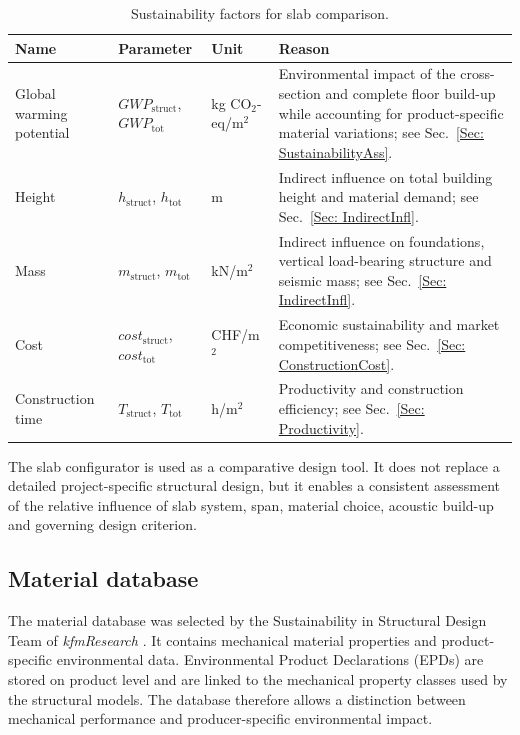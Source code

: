 \begin{table}[htbp]
    \centering
    \begingroup
    \small
    \setlength{\tabcolsep}{4pt}
    \renewcommand{\arraystretch}{1.15}
    \begin{tabularx}{\textwidth}{@{}l|l|l|X@{}}
    \hline
    \textbf{Name} & \textbf{Parameter} & \textbf{Unit} & \textbf{Reason} \\ \hline
    Global warming potential &
    $GWP_{\mathrm{struct}}$, $GWP_{\mathrm{tot}}$ &
    kg CO$_2$-eq/m$^2$ &
    Environmental impact of the cross-section and complete floor build-up while accounting for product-specific material variations; see Sec.~\ref{Sec: SustainabilityAss}. \\
    Height &
    $h_{\mathrm{struct}}$, $h_{\mathrm{tot}}$ &
    m &
    Indirect influence on total building height and material demand; see Sec.~\ref{Sec: IndirectInfl}. \\
    Mass &
    $m_{\mathrm{struct}}$, $m_{\mathrm{tot}}$ &
    kN/m$^2$ &
    Indirect influence on foundations, vertical load-bearing structure and seismic mass; see Sec.~\ref{Sec: IndirectInfl}. \\
    Cost &
    $cost_{\mathrm{struct}}$, $cost_{\mathrm{tot}}$ &
    CHF/m$^2$ &
    Economic sustainability and market competitiveness; see Sec.~\ref{Sec: ConstructionCost}. \\
    Construction time &
    $T_{\mathrm{struct}}$, $T_{\mathrm{tot}}$ &
    h/m$^2$ &
    Productivity and construction efficiency; see Sec.~\ref{Sec: Productivity}. \\ \hline
    \end{tabularx}
    \endgroup
    \caption{Sustainability factors for slab comparison.}
    \label{tab:sustainability_factors_slab_comparison}
\end{table}

\noindent The slab configurator is used as a comparative design tool. It does not replace a detailed project-specific structural design, but it enables a consistent assessment of the relative influence of slab system, span, material choice, acoustic build-up and governing design criterion.

\subsection{Material database}

The material database was selected by the Sustainability in Structural Design Team of \textit{kfmResearch} \cite{kfmResearch2026}. It contains mechanical material properties and product-specific environmental data. Environmental Product Declarations (EPDs) are stored on product level and are linked to the mechanical property classes used by the structural models. The database therefore allows a distinction between mechanical performance and producer-specific environmental impact.


